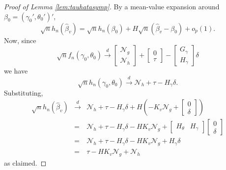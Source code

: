 \begin{proof}[Proof of Lemma \ref{lem:tauhatasymp}]
By a mean-value expansion around $\beta_0 = ( \gamma_0', \theta_0')'$,
	$$\sqrt{n}h_n\left(\widehat{\beta}_v \right) = \sqrt{n}h_n(\beta_0) + H \sqrt{n} \left(\widehat{\beta}_v - \beta_0\right) + o_p(1).$$
Now, since
	$$\sqrt{n}f_n(\gamma_0,\theta_0) \overset{d}{\rightarrow} \left[\begin{array}{c} \mathscr{N}_g\\  \mathscr{N}_h\end{array}\right]+ \left[ \begin{array}{c} 0\\ \tau\end{array}\right] - \left[\begin{array}{c}G_\gamma\\ H_\gamma \end{array}\right]\delta$$
we have
	$$\sqrt{n}h_n(\gamma_0,\theta_0)\overset{d}{\rightarrow} \mathscr{N}_h + \tau - H_\gamma \delta.$$
Substituting, 
	\begin{eqnarray*}
		\sqrt{n}h_n(\widehat{\beta}_v) &\overset{d}{\rightarrow}&  \mathscr{N}_h + \tau - H_\gamma \delta+ H\left( -K_v \mathscr{N}_g + \left[\begin{array}{c} 0 \\ \delta \end{array} \right]\right)\\ 
			&=& \mathscr{N}_h + \tau - H_\gamma \delta - HK_v \mathscr{N}_g + \left[ \begin{array}{cc} H_\theta & H_\gamma \end{array}\right] \left[\begin{array}{c} 0 \\ \delta \end{array} \right]\\
			&=& \mathscr{N}_h  + \tau - H_\gamma \delta - HK_v \mathscr{N}_g  + H_\gamma \delta\\
			&=& \tau - HK_v \mathscr{N}_g + \mathscr{N}_h
	\end{eqnarray*}
as claimed.
\end{proof}

